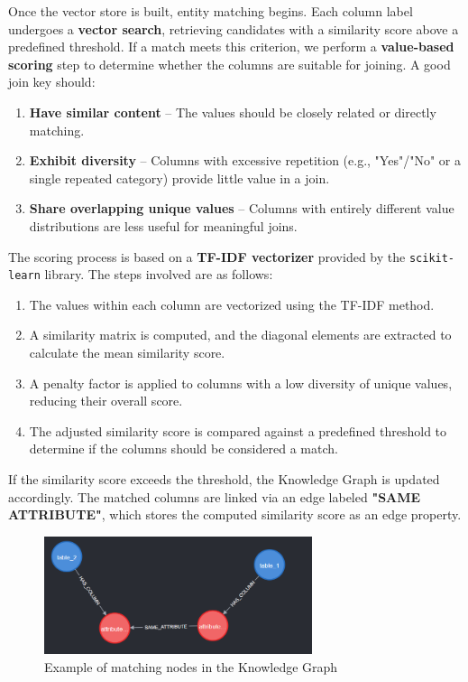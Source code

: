 Once the vector store is built, entity matching begins. Each column label undergoes a \textbf{vector search}, retrieving candidates with a similarity score above a predefined threshold. If a match meets this criterion, we perform a \textbf{value-based scoring} step to determine whether the columns are suitable for joining. A good join key should:

\begin{enumerate}
    \item \textbf{Have similar content} – The values should be closely related or directly matching.
    \item \textbf{Exhibit diversity} – Columns with excessive repetition (e.g., "Yes"/"No" or a single repeated category) provide little value in a join.
    \item \textbf{Share overlapping unique values} – Columns with entirely different value distributions are less useful for meaningful joins.
\end{enumerate}


The scoring process is based on a \textbf{TF-IDF vectorizer} provided by the \texttt{scikit-learn} library. The steps involved are as follows:

\begin{enumerate}
    \item The values within each column are vectorized using the TF-IDF method.
    \item A similarity matrix is computed, and the diagonal elements are extracted to calculate the mean similarity score.
    \item A penalty factor is applied to columns with a low diversity of unique values, reducing their overall score.
    \item The adjusted similarity score is compared against a predefined threshold to determine if the columns should be considered a match.
\end{enumerate}

If the similarity score exceeds the threshold, the Knowledge Graph is updated accordingly. The matched columns are linked via an edge labeled \textbf{"SAME ATTRIBUTE"}, which stores the computed similarity score as an edge property.
\begin{figure}[h]
    \centering
\includegraphics[width=0.7\textwidth]{IMAGES/immagine_2025-03-27_154727649.png}
    \caption{Example of matching nodes in the Knowledge Graph}
    \label{fig:Matching Nodes}
\end{figure}

